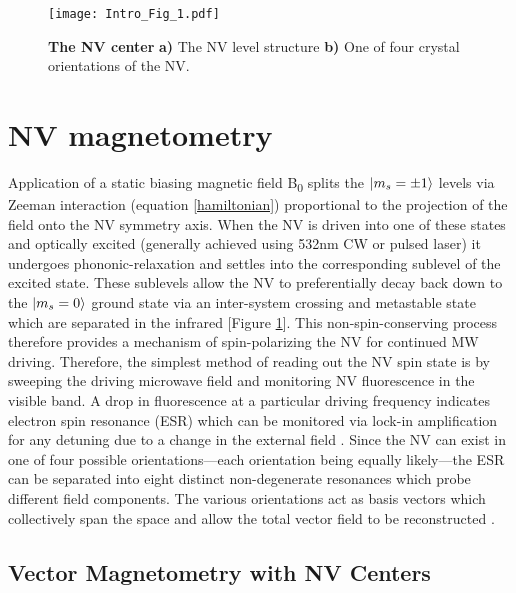 \begin{figure}[t!]
\centering
\texttt{[image: Intro\_Fig\_1.pdf]}  
\caption{\textbf{The NV center} \textbf{a)} The NV level structure \textbf{b)} One of four crystal orientations of the NV.}
\label{Fig_one}
\end{figure}

\section{NV magnetometry} %

Application of a static biasing magnetic field B\textsubscript{0} splits the $\ket{m_s = \pm1}$ levels via Zeeman interaction (equation \ref{hamiltonian}) proportional to the projection of the field onto the NV symmetry axis. When the NV is driven into one of these states and optically excited (generally achieved using 532nm CW or pulsed laser) it undergoes phononic-relaxation and settles into the corresponding sublevel of the excited state. These sublevels allow the NV to preferentially decay back down to the $\ket{m_s=0}$ ground state via an inter-system crossing and metastable state which are separated in the infrared [Figure \ref{Fig_one}]. This non-spin-conserving process therefore provides a mechanism of spin-polarizing the NV for continued MW driving. Therefore, the simplest method of reading out the NV spin state is by sweeping the driving microwave field and monitoring NV fluorescence in the visible band. A drop in fluorescence at a particular driving frequency indicates electron spin resonance (ESR) which can be monitored via lock-in amplification for any detuning due to a change in the external field \cite{jensen2017magnetometry,rondin2014magnetometry}. Since the NV can exist in one of four possible orientations---each orientation being equally likely---the ESR can be separated into eight distinct non-degenerate resonances which probe different field components. The various orientations act as basis vectors which collectively span the space and allow the total vector field to be reconstructed \cite{jensen2017magnetometry}. 

\subsection{Vector Magnetometry with NV Centers}\label{ch1:vect}

